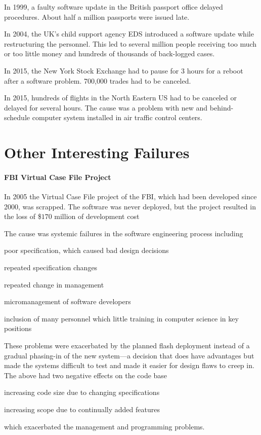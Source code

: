 In 1999, a faulty software update in the British passport office delayed procedures.
About half a million passports were issued late.

In 2004, the UK's child support agency EDS introduced a software update while restructuring the personnel.
This led to several million people receiving too much or too little money and hundreds of thousands of back-logged cases.

In 2015, the New York Stock Exchange had to pause for $3$ hours for a reboot after a software problem.
700,000 trades had to be canceled.

In 2015, hundreds of flights in the North Eastern US had to be canceled or delayed for several hours.
The cause was a problem with new and behind-schedule computer system installed in air traffic control centers.

\section{Other Interesting Failures}

\paragraph{FBI Virtual Case File Project}
In 2005 the Virtual Case File project of the FBI, which had been developed since 2000, was scrapped.
The software was never deployed, but the project resulted in the loss of \$$170$ million of development cost

The cause was systemic failures in the software engineering process including
\begin{compactitem}
 \item poor specification, which caused bad design decisions
 \item repeated specification changes
 \item repeated change in management
 \item micromanagement of software developers
 \item inclusion of many personnel which little training in computer science in key positions
\end{compactitem}
These problems were exacerbated by the planned flash deployment instead of a gradual phasing-in of the new system---a decision that does have advantages but made the systems difficult to test and made it easier for design flaws to creep in.
The above had two negative effects on the code base
\begin{compactitem}
 \item increasing code size due to changing specifications
 \item increasing scope due to continually added features
\end{compactitem}
which exacerbated the management and programming problems.

